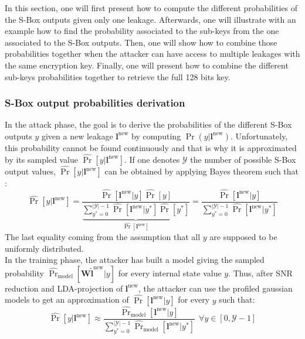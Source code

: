 In this section, one will first present how to compute the different 
probabilities of the S-Box outputs given only one leakage. Afterwards, one 
will illustrate with an example how to find the probability associated to 
the sub-keys from the one associated to the S-Box outputs. Then, one will 
show how to combine those probabilities together when the attacker can 
have access to multiple leakages with the same encryption key. Finally, 
one will present how to combine the different sub-keys probabilities 
together to retrieve the full 128 bits key. 
\subsubsection{S-Box output probabilities derivation}
In the attack phase, the goal is to derive the probabilities of the 
different S-Box outputs $y$ given a new leakage $\mathbf{l}^{\text{new}}$ 
by computing $\Pr(y|\mathbf{l}^{\text{new}})$. Unfortunately, this 
probability cannot be found continuously and that is why it is 
approximated by its sampled value $\hat{\Pr}[y|\mathbf{l}^{\text{new}}]$. 
If one denotes  $\mathcal{Y}$ the number of possible S-Box output values, 
$\hat{\Pr}[y|\mathbf{l}^{\text{new}}]$ can be obtained by applying Bayes 
theorem such that :
\begin{equation*}
    \hat{\Pr}[y|\mathbf{l}^{\text{new}}]=\frac{\hat{\Pr} 
[\mathbf{l}^{\text{new}}|y]\hat{\Pr}[y]}{\underbrace{\sum_{y^*=0}^{|\mathcal{Y}|-1}\hat{\Pr}[\mathbf{l}^{\text{new}}|y^*] 
\hat{\Pr}[y^*]}_{\hat{\Pr}[\mathbf{l}^{\text{new}}]}} = 
\frac{\hat{\Pr}[\mathbf{l}^{\text{new}}|y]}{\sum_{y^*=0}^{|\mathcal{Y}|-1}\hat{\Pr}[\mathbf{l}^{\text{new}}|y^*]} 
\end{equation*}
The last equality coming from the assumption that all $y$ are supposed to 
be uniformly distributed.\\

In the training phase, the attacker has built a model giving the sampled 
probability 
$\hat{\Pr}_{\text{model}}[\mathbf{W}\tilde{\mathbf{l}}^{\text{new}}|y]$ 
for every internal state value $y$. Thus, after SNR reduction and 
LDA-projection of $\mathbf{l}^{\text{new}}$, the attacker can use the 
profiled gaussian models to get an approximation of 
$\hat{\Pr}[\mathbf{l}^{\text{new}}|y]$ for every $y$ such that:
\begin{equation*}
    \hat{\Pr}[y|\mathbf{l}^{\text{new}}] \approx 
\frac{\hat{\Pr}_{\text{model}}[\mathbf{l}^{\text{new}}|y]}{\sum_{y^*=0}^{|\mathcal{Y}|-1}\hat{\Pr}_{\text{model}}[\mathbf{l}^{\text{new}}|y^*]}~~\forall 
y\in [0,\mathcal{Y}-1]
\end{equation*}
